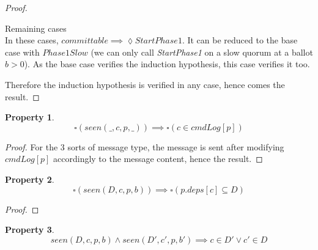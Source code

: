 \documentclass[a4paper]{article}
\theoremstyle{definition}
\theoremstyle{plain}
\newtheorem{property}{Property}
\begin{document}
\begin{proof}
\begin{case}
\begin{case}
            \item Remaining cases \\
            In these cases, $committable \implies \lozenge StartPhase1$. It can be reduced to the base case with $Phase1Slow$ (we can only call \textit{StartPhase1} on a slow quorum at a ballot $b > 0$).
            As the base case verifies the induction hypothesis, this case verifies it too.


        \end{case}

    \end{case}
Therefore the induction hypothesis is verified in any case, hence comes the result.

\end{proof}

\begin{property}
\begin{equation*}
    \square(seen(\_,c,p,\_)) \implies \square(c \in cmdLog[p])
\end{equation*}
\end{property}

\begin{proof}
For the 3 sorts of message type, the message is sent after modifying $cmdLog[p]$ accordingly to the message content, hence the result.
\end{proof}


\begin{property}
\begin{equation*}
    \square(seen(D,c,p,b)) \implies \square(p.deps[c] \subseteq D)
\end{equation*}
\end{property}

\begin{proof}
\end{proof}

\begin{property}
\begin{equation*}
    seen(D,c,p,b) \wedge seen(D',c',p,b') \implies c \in D' \vee c' \in D
\end{equation*}
\end{property}
\end{document}
